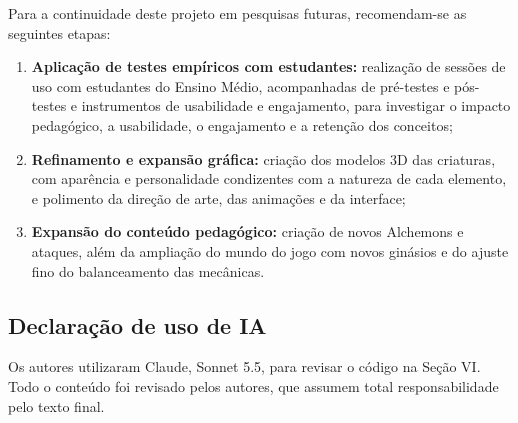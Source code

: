 Para a continuidade deste projeto em pesquisas futuras, recomendam-se as seguintes etapas:
\begin{enumerate}
    \item \textbf{Aplicação de testes empíricos com estudantes:} realização de sessões de uso com estudantes do Ensino Médio, acompanhadas de pré-testes e pós-testes e instrumentos de usabilidade e engajamento, para investigar o impacto pedagógico, a usabilidade, o engajamento e a retenção dos conceitos;
    \item \textbf{Refinamento e expansão gráfica:} criação dos modelos 3D das criaturas, com aparência e personalidade condizentes com a natureza de cada elemento, e polimento da direção de arte, das animações e da interface;
    \item \textbf{Expansão do conteúdo pedagógico:} criação de novos Alchemons e ataques, além da ampliação do mundo do jogo com novos ginásios e do ajuste fino do balanceamento das mecânicas.
\end{enumerate}


\subsection{Declaração de uso de IA}
Os autores utilizaram Claude, Sonnet 5.5, para revisar o código na Seção VI. Todo o conteúdo foi revisado pelos autores, que assumem total responsabilidade pelo texto final.
